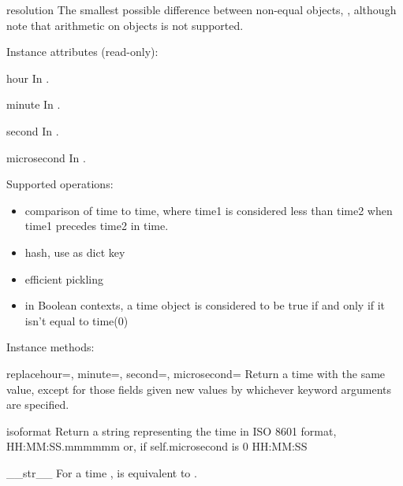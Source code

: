 \begin{memberdesc}{resolution}
        The smallest possible difference between non-equal 
        objects, , although note that
        arithmetic on  objects is not supported.
\end{memberdesc}

Instance attributes (read-only):

\begin{memberdesc}{hour}
In .
\end{memberdesc}
\begin{memberdesc}{minute}     
In .
\end{memberdesc}
\begin{memberdesc}{second}         
In .
\end{memberdesc}
\begin{memberdesc}{microsecond}    
In .
\end{memberdesc}

Supported operations:

\begin{itemize}
  \item
    comparison of time to time, where time1 is considered
    less than time2 when time1 precedes time2 in time.

  \item
    hash, use as dict key

  \item
    efficient pickling

  \item
    in Boolean contexts, a time object is considered to be true
    if and only if it isn't equal to time(0)
\end{itemize}

Instance methods:

\begin{methoddesc}{replace}{hour=, minute=, second=, microsecond=}
    Return a time with the same value, except for those fields given
    new values by whichever keyword arguments are specified.
\end{methoddesc}

\begin{methoddesc}{isoformat}{}
    Return a string representing the time in ISO 8601 format,
        HH:MM:SS.mmmmmm
    or, if self.microsecond is 0
        HH:MM:SS
\end{methoddesc}

\begin{methoddesc}{__str__}{}
    For a time ,  is equivalent to
    .
\end{methoddesc}

